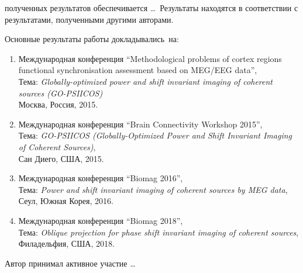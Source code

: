 {\reliability} полученных результатов обеспечивается \ldots \ Результаты находятся в соответствии с результатами, полученными другими авторами.


{\probation}

Основные результаты работы докладывались~на:
\begin{enumerate}
    \item Международная конференция ``Methodological problems of cortex regions functional synchronisation assessment based on MEG/EEG data'',\\
      Тема: \emph{Globally-optimized power and shift invariant imaging of coherent sources (GO-PSIICOS)}\\
      Москва, Россия, 2015.
    \item Международная конференция ``Brain Connectivity Workshop 2015'', \\
        Тема: \emph{GO-PSIICOS (Globally-Optimized Power and Shift Invariant Imaging of Coherent Sources)},\\
        Сан Диего, США, 2015.
    \item Международная конференция ``Biomag 2016'', \\
        Тема: \emph{Power and shift invariant imaging of coherent sources by MEG data},\\
        Сеул, Южная Корея, 2016.
    \item Международная конференция ``Biomag 2018'', \\
        Тема: \emph{Oblique projection for phase shift invariant imaging of coherent sources},\\
        Филадельфия, США, 2018.
\end{enumerate}



{\contribution} Автор принимал активное участие \ldots


